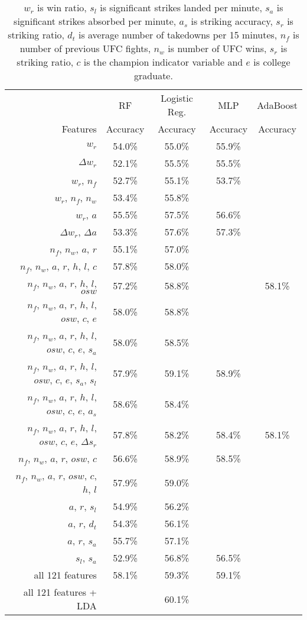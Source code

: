 \begin{center}
\begin{table}[h]
\begin{tabular}{r|cccc}
\toprule
         & RF       & Logistic Reg. & MLP      & AdaBoost\\
Features & Accuracy & Accuracy      & Accuracy & Accuracy\\
\hline
$w_r$ & 54.0\% & 55.0\% & 55.9\% & \\
$\Delta w_r$ & 52.1\% & 55.5\% & 55.5\% & \\
$w_r$, $n_f$ & 52.7\% & 55.1\% & 53.7\% & \\
$w_r$, $n_f$, $n_w$ & 53.4\% & 55.8\% &  & \\
$w_r$, $a$ & 55.5\% & 57.5\% & 56.6\% & \\
$\Delta w_r$, $\Delta a$ & 53.3\% & 57.6\% & 57.3\% & \\
$n_f$, $n_w$, $a$, $r$ & 55.1\% & 57.0\% \\
$n_f$, $n_w$, $a$, $r$, $h$, $l$, $c$ & 57.8\% & 58.0\% & &\\
$n_f$, $n_w$, $a$, $r$, $h$, $l$, $osw$ & 57.2\% & 58.8\% & & 58.1\%\\
$n_f$, $n_w$, $a$, $r$, $h$, $l$, $osw$, $c$, $e$ & 58.0\% & 58.8\% & &\\
$n_f$, $n_w$, $a$, $r$, $h$, $l$, $osw$, $c$, $e$, $s_a$ & 58.0\% & 58.5\% & & \\
$n_f$, $n_w$, $a$, $r$, $h$, $l$, $osw$, $c$, $e$, $s_a$, $s_l$ & 57.9\% &59.1\% &58.9\% & \\
$n_f$, $n_w$, $a$, $r$, $h$, $l$, $osw$, $c$, $e$, $a_s$ & 58.6\% & 58.4\% \\
$n_f$, $n_w$, $a$, $r$, $h$, $l$, $osw$, $c$, $e$, $\Delta s_r$ & 57.8\% & 58.2\% & 58.4\% & 58.1\%\\
$n_f$, $n_w$, $a$, $r$, $osw$, $c$ & 56.6\% & 58.9\% & 58.5\% \\
$n_f$, $n_w$, $a$, $r$, $osw$, $c$, $h$, $l$ & 57.9\% & 59.0\% & &\\
$a$, $r$, $s_l$ & 54.9\% & 56.2\% & & \\
$a$, $r$, $d_t$ & 54.3\% & 56.1\% & & \\
$a$, $r$, $s_a$ & 55.7\% & 57.1\% & & \\
$s_l$, $s_a$ & 52.9\% & 56.8\% & 56.5\% & \\
all 121 features & 58.1\% & 59.3\% & 59.1\% & \\
all 121 features + LDA &  & 60.1\% & & \\
\bottomrule
\end{tabular}
\caption{$w_r$ is win ratio, $s_l$ is significant strikes landed per minute,
$s_a$ is significant strikes absorbed per minute, $a_s$ is striking accuracy,
$s_r$ is striking ratio, $d_t$ is average number of takedowns per 15 minutes,
$n_f$ is number of previous UFC fights, $n_w$ is number
of UFC wins, $s_r$ is striking ratio, $c$ is the champion indicator variable and $e$ is college graduate.}
\label{other_features}
\end{table}
\end{center}

